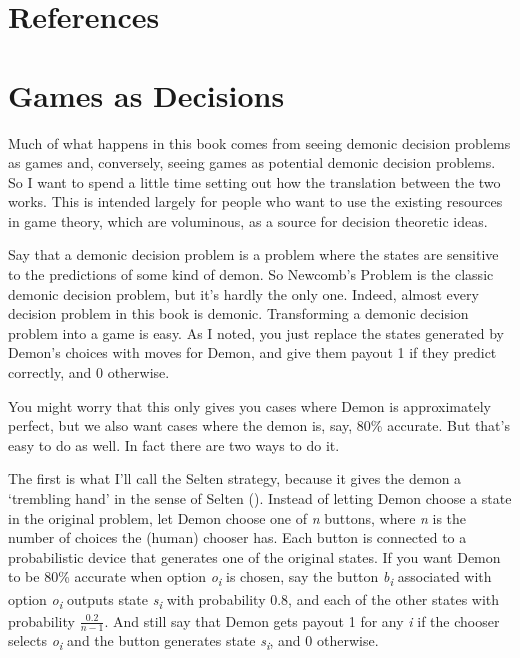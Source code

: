\documentclass[
  12pt,
  letterpaper,
  DIV=11,
  numbers=noendperiod]{scrreprt}
\begin{document}

\chapter*{References}\label{references}


\cleardoublepage
{}
{}
\appendix

\chapter{Games as Decisions}\label{sec-gad}

Much of what happens in this book comes from seeing demonic decision
problems as games and, conversely, seeing games as potential demonic
decision problems. So I want to spend a little time setting out how the
translation between the two works. This is intended largely for people
who want to use the existing resources in game theory, which are
voluminous, as a source for decision theoretic ideas.

Say that a demonic decision problem is a problem where the states are
sensitive to the predictions of some kind of demon. So Newcomb's Problem
is the classic demonic decision problem, but it's hardly the only one.
Indeed, almost every decision problem in this book is demonic.
Transforming a demonic decision problem into a game is easy. As I noted,
you just replace the states generated by Demon's choices with moves for
Demon, and give them payout 1 if they predict correctly, and 0
otherwise.

You might worry that this only gives you cases where Demon is
approximately perfect, but we also want cases where the demon is, say,
80\% accurate. But that's easy to do as well. In fact there are two ways
to do it.

The first is what I'll call the Selten strategy, because it gives the
demon a `trembling hand' in the sense of Selten
(). Instead of letting Demon choose a
state in the original problem, let Demon choose one of \emph{n} buttons,
where \emph{n} is the number of choices the (human) chooser has. Each
button is connected to a probabilistic device that generates one of the
original states. If you want Demon to be 80\% accurate when option
\emph{o\textsubscript{i}} is chosen, say the button
\emph{b\textsubscript{i}} associated with option
\emph{o\textsubscript{i}} outputs state \emph{s\textsubscript{i}} with
probability 0.8, and each of the other states with probability
\(\frac{0.2}{n - 1}\). And still say that Demon gets payout 1 for any
\emph{i} if the chooser selects \emph{o\textsubscript{i}} and the button
generates state \emph{s\textsubscript{i}}, and 0 otherwise.
\end{document}
